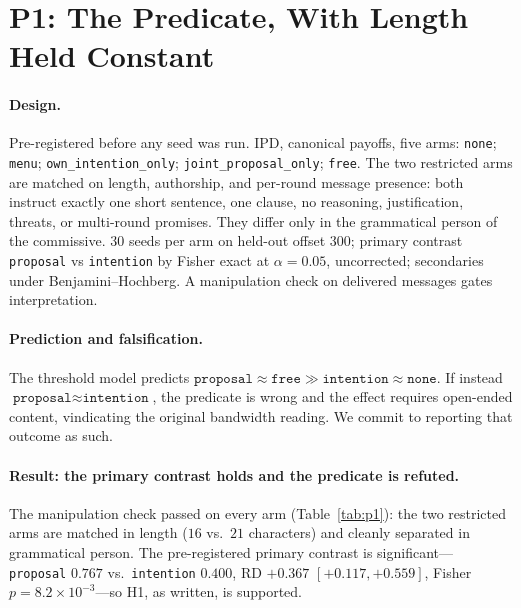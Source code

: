 \section{P1: The Predicate, With Length Held Constant}
\label{sec:p1}

\paragraph{Design.}
Pre-registered before any seed was run. IPD, canonical payoffs, five arms:
\texttt{none}; \texttt{menu}; \texttt{own\_intention\_only}; \texttt{joint\_proposal\_only};
\texttt{free}. The two restricted arms are matched on length, authorship, and per-round
message presence: both instruct exactly one short sentence, one clause, no reasoning,
justification, threats, or multi-round promises. They differ only in the grammatical
person of the commissive. $30$ seeds per arm on held-out offset $300$; primary contrast
\texttt{proposal} vs \texttt{intention} by Fisher exact at $\alpha{=}0.05$, uncorrected;
secondaries under Benjamini--Hochberg. A manipulation check on delivered messages gates
interpretation.

\paragraph{Prediction and falsification.}
The threshold model predicts $\texttt{proposal}\approx\texttt{free}\gg
\texttt{intention}\approx\texttt{none}$. If instead
$\texttt{proposal}\approx\texttt{intention}$, the predicate is wrong and the effect
requires open-ended content, vindicating the original bandwidth reading. We commit to
reporting that outcome as such.

\paragraph{Result: the primary contrast holds and the predicate is refuted.}
The manipulation check passed on every arm (Table~\ref{tab:p1}): the two restricted
arms are matched in length ($16$ vs.\ $21$ characters) and cleanly separated in
grammatical person. The pre-registered primary contrast is significant---
\texttt{proposal} $0.767$ vs.\ \texttt{intention} $0.400$, RD $+0.367$
$[+0.117,+0.559]$, Fisher $p{=}8.2\times10^{-3}$---so H1, as written, is supported.

